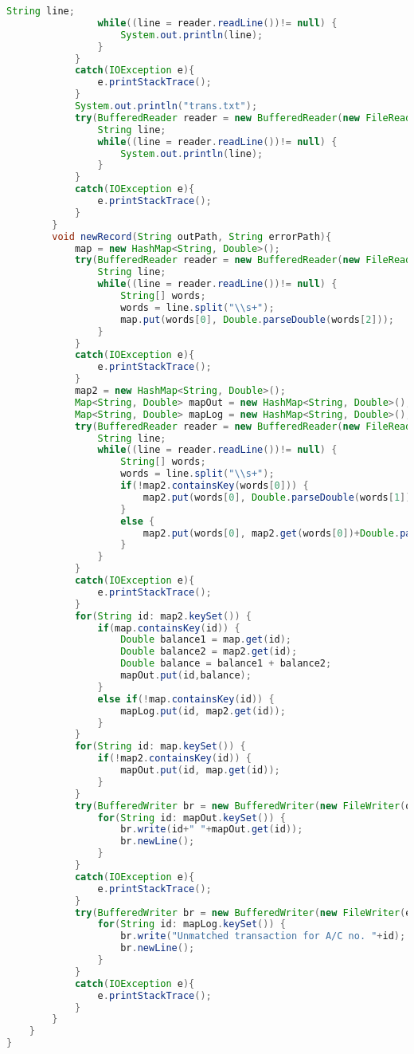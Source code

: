 \documentclass{article}
\begin{document}
\begin{lstlisting}[language=Java, caption=FileProblem]
				String line;
				while((line = reader.readLine())!= null) {
					System.out.println(line);
				}
			}
			catch(IOException e){
				e.printStackTrace();
			}
			System.out.println("trans.txt");
			try(BufferedReader reader = new BufferedReader(new FileReader(filePath2))){
				String line;
				while((line = reader.readLine())!= null) {
					System.out.println(line);
				}
			}
			catch(IOException e){
				e.printStackTrace();
			}
		}
		void newRecord(String outPath, String errorPath){
			map = new HashMap<String, Double>();
			try(BufferedReader reader = new BufferedReader(new FileReader(filePath1))){
				String line;
				while((line = reader.readLine())!= null) {
					String[] words;
					words = line.split("\\s+");
					map.put(words[0], Double.parseDouble(words[2]));	
				}
			}
			catch(IOException e){
				e.printStackTrace();
			}
			map2 = new HashMap<String, Double>();
			Map<String, Double> mapOut = new HashMap<String, Double>();
			Map<String, Double> mapLog = new HashMap<String, Double>();
			try(BufferedReader reader = new BufferedReader(new FileReader(filePath2))){
				String line;
				while((line = reader.readLine())!= null) {
					String[] words;
					words = line.split("\\s+");
					if(!map2.containsKey(words[0])) {
						map2.put(words[0], Double.parseDouble(words[1]));
					}
					else {
						map2.put(words[0], map2.get(words[0])+Double.parseDouble(words[1]));
					}
				}
			}
			catch(IOException e){
				e.printStackTrace();
			}
			for(String id: map2.keySet()) {
				if(map.containsKey(id)) {
					Double balance1 = map.get(id);
					Double balance2 = map2.get(id);
					Double balance = balance1 + balance2;
					mapOut.put(id,balance);
				}
				else if(!map.containsKey(id)) {
					mapLog.put(id, map2.get(id));
				}
			}
			for(String id: map.keySet()) {
				if(!map2.containsKey(id)) {
					mapOut.put(id, map.get(id));
				}
			}
			try(BufferedWriter br = new BufferedWriter(new FileWriter(outPath))){
				for(String id: mapOut.keySet()) {
					br.write(id+" "+mapOut.get(id));
					br.newLine();
				}
			}
			catch(IOException e){
				e.printStackTrace();
			}
			try(BufferedWriter br = new BufferedWriter(new FileWriter(errorPath))){
				for(String id: mapLog.keySet()) {
					br.write("Unmatched transaction for A/C no. "+id);
					br.newLine();
				}
			}
			catch(IOException e){
				e.printStackTrace();
			}
		}
	}
}
\end{lstlisting}
\end{document}
